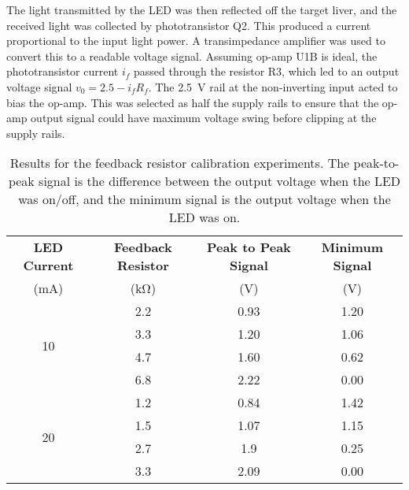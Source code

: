 The light transmitted by the LED was then reflected off the target liver, and the received light was collected by phototransistor Q2. This produced a current proportional to the input light power. A transimpedance amplifier was used to convert this to a readable voltage signal. Assuming op-amp U1B is ideal, the phototransistor current $i_f$ passed through the resistor R3, which led to an output voltage signal $v_0 = 2.5 - i_f R_f$. The \SI{2.5}{\volt} rail at the non-inverting input acted to bias the op-amp. This was selected as half the supply rails to ensure that the op-amp output signal could have maximum voltage swing before clipping at the supply rails.\\

\begin{table}[htb]
	\centering
	\caption{Results for the feedback resistor calibration experiments. The peak-to-peak signal is the difference between the output voltage when the LED was on/off, and the minimum signal is the output voltage when the LED was on.}
	\label{tab: tia feedback resistor}
	\begin{tabular}{|c|c|c|c|}
		\hline
		\textbf{LED Current} & \textbf{Feedback Resistor} & \textbf{Peak to Peak Signal} & \textbf{Minimum Signal}\\
		(mA)	&	(\si{\kilo\ohm})	&	(V)	&	(V)\\
		\hline
		\multirow{4}{*}{10}	&	2.2	&	0.93	&	1.20\\
						\cline{2-4}
						&	3.3	&	1.20	&	1.06\\
						\cline{2-4}
						&	4.7	&	1.60	&	0.62\\
						\cline{2-4}
						&	6.8	&	2.22	&	0.00\\
		\hline
		\multirow{4}{*}{20}	&	1.2	&	0.84	&	1.42\\
						\cline{2-4}
						&	1.5	&	1.07	&	1.15\\
						\cline{2-4}
						&	2.7	&	1.9	&	0.25\\
						\cline{2-4}
						&	3.3	&	2.09	&	0.00\\
		\hline
	\end{tabular}
\end{table}

